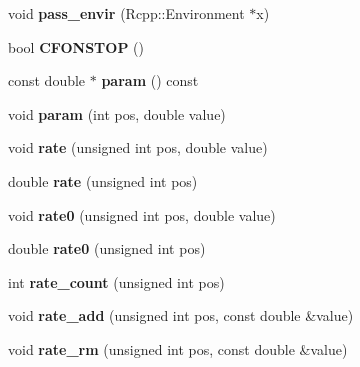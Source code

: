 \begin{DoxyCompactItemize}
\mbox{\label{classodeproblem_a6a1253090d65c34a9a26e77b01a82573}} 
void {\bfseries pass\+\_\+envir} (Rcpp\+::\+Environment $\ast$x)
\item 
\mbox{\label{classodeproblem_a962ce2e5ac9d9b6514e6d06c52ece74e}} 
bool {\bfseries C\+F\+O\+N\+S\+T\+OP} ()
\item 
\mbox{\label{classodeproblem_aeedc05b398a0440b9d8f96876e56a8a6}} 
const double $\ast$ {\bfseries param} () const
\item 
\mbox{\label{classodeproblem_a9669835dd93ca8415466b031aaccf0a5}} 
void {\bfseries param} (int pos, double value)
\item 
\mbox{\label{classodeproblem_af6e95b3ef6e66fd90bd74d9d3e4cfdb9}} 
void {\bfseries rate} (unsigned int pos, double value)
\item 
\mbox{\label{classodeproblem_abb46c0c4c4ba37273775f207989b8593}} 
double {\bfseries rate} (unsigned int pos)
\item 
\mbox{\label{classodeproblem_a037f4a9a3c152237557d092f5c9b18f2}} 
void {\bfseries rate0} (unsigned int pos, double value)
\item 
\mbox{\label{classodeproblem_a1a26afe1439b4b827e346a1eec4d5284}} 
double {\bfseries rate0} (unsigned int pos)
\item 
\mbox{\label{classodeproblem_a7b5b4b266d8205069f6fa806fec959bd}} 
int {\bfseries rate\+\_\+count} (unsigned int pos)
\item 
\mbox{\label{classodeproblem_a7985d0d2c71f3210fa043038efa7696b}} 
void {\bfseries rate\+\_\+add} (unsigned int pos, const double \&value)
\item 
\mbox{\label{classodeproblem_a6cd2af7fdeca1734d4ac96c31286b086}} 
void {\bfseries rate\+\_\+rm} (unsigned int pos, const double \&value)
\item 
\mbox{\label{classodeproblem_aec484a1e3327cac5360e9b323ce995f6}} 

\end{DoxyCompactItemize}
